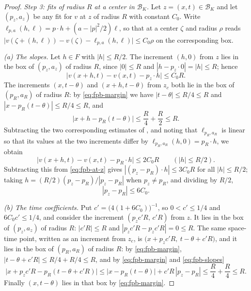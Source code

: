 \begin{proof}
\emph{Step 3: fits of radius $R$ at a center in $\mathcal B_K$.}
Let $z=(x,t)\in\mathcal B_K$ and let $(p_z,a_z)$ be any fit for $v$ at $z$ of
radius $R$ with constant $C_0$. Write
$\ell_{p,a}(h,\ell)=p\cdot h+(a-|p|^2/2)\ell$, so that  at a
center $\zeta$ and radius $\rho$ reads
$\bigl|v(\zeta+(h,\ell))-v(\zeta)-\ell_{p,a}(h,\ell)\bigr|\le C_0\rho$ on the
corresponding box.

\emph{(a) The slopes.} Let $h\in F$ with $|h|\le R/2$. The increment $(h,0)$
from $z$ lies in the box of $(p_z,a_z)$ of radius $R$, since $|0|\le R$ and
$|h-p_z\cdot0|=|h|\le R$; hence
\begin{equation}\label{eq:fpb-at-z}
  \bigl|v(x+h,t)-v(x,t)-p_z\cdot h\bigr|\le C_0R .
\end{equation}
The increments $(x,t-\theta)$ and $(x+h,t-\theta)$ from $z_c$ both lie in the box
of $(p_R,a_R)$ of radius $R$: by \eqref{eq:fpb-margin} we have
$|t-\theta|\le R/4\le R$ and $|x-p_R(t-\theta)|\le R/4\le R$, and
\[
  \bigl|x+h-p_R(t-\theta)\bigr|\le\frac R4+\frac R2\le R .
\]
Subtracting the two corresponding estimates of , and noting that
$\ell_{p_R,a_R}$ is linear so that its values at the two increments differ by
$\ell_{p_R,a_R}(h,0)=p_R\cdot h$, we obtain
\[
  \bigl|v(x+h,t)-v(x,t)-p_R\cdot h\bigr|\le2C_0R\qquad(|h|\le R/2).
\]
Subtracting this from \eqref{eq:fpb-at-z} gives
$|(p_z-p_R)\cdot h|\le3C_0R$ for all $|h|\le R/2$; taking
$h=(R/2)(p_z-p_R)/|p_z-p_R|$ when $p_z\ne p_R$, and dividing by $R/2$,
\begin{equation}\label{eq:fpb-slopes}
  |p_z-p_R|\le6C_0 .
\end{equation}

\emph{(b) The time coefficients.} Put $c'=\bigl(4(1+6C_0)\bigr)^{-1}$, so
$0<c'\le1/4$ and $6C_0c'\le1/4$, and consider the increment
$(p_zc'R,\,c'R)$ from $z$. It lies in the box of $(p_z,a_z)$ of radius $R$:
$|c'R|\le R$ and $|p_zc'R-p_zc'R|=0\le R$. The same space-time point, written as
an increment from $z_c$, is $\bigl(x+p_zc'R,\ t-\theta+c'R\bigr)$, and it lies
in the box of $(p_R,a_R)$ of radius $R$: by \eqref{eq:fpb-margin},
$|t-\theta+c'R|\le R/4+R/4\le R$, and by \eqref{eq:fpb-margin} and
\eqref{eq:fpb-slopes}
\[
  \bigl|x+p_zc'R-p_R(t-\theta+c'R)\bigr|
   \le\bigl|x-p_R(t-\theta)\bigr|+c'R\,|p_z-p_R|
   \le\frac R4+\frac R4\le R .
\]
Finally $(x,t-\theta)$ lies in that box by \eqref{eq:fpb-margin}.


\end{proof}
